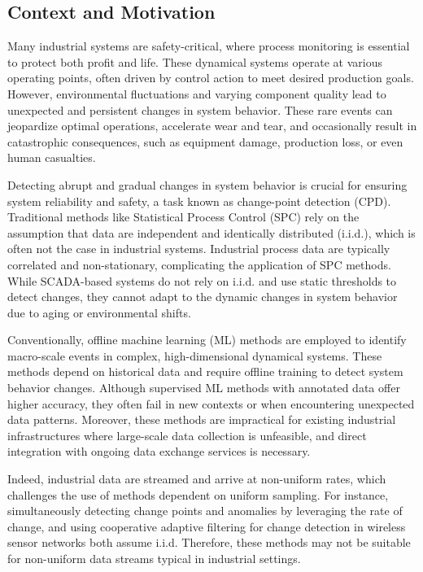 \subsection{Context and Motivation}
Many industrial systems are safety-critical, where process monitoring is essential to protect both profit and life. These dynamical systems operate at various operating points, often driven by control action to meet desired production goals. However, environmental fluctuations and varying component quality lead to unexpected and persistent changes in system behavior. These rare events can jeopardize optimal operations, accelerate wear and tear, and occasionally result in catastrophic consequences, such as equipment damage, production loss, or even human casualties.

Detecting abrupt and gradual changes in system behavior is crucial for ensuring system reliability and safety, a task known as change-point detection (CPD). Traditional methods like Statistical Process Control (SPC) rely on the assumption that data are independent and identically distributed (i.i.d.), which is often not the case in industrial systems. Industrial process data are typically correlated and non-stationary, complicating the application of SPC methods. While SCADA-based systems do not rely on i.i.d. and use static thresholds to detect changes, they cannot adapt to the dynamic changes in system behavior due to aging or environmental shifts.

Conventionally, offline machine learning (ML) methods are employed to identify macro-scale events in complex, high-dimensional dynamical systems. These methods depend on historical data and require offline training to detect system behavior changes. Although supervised ML methods with annotated data offer higher accuracy, they often fail in new contexts or when encountering unexpected data patterns. Moreover, these methods are impractical for existing industrial infrastructures where large-scale data collection is unfeasible, and direct integration with ongoing data exchange services is necessary.

Indeed, industrial data are streamed and arrive at non-uniform rates, which challenges the use of methods dependent on uniform sampling. For instance, \citet{Liu2023} simultaneously detecting change points and anomalies by leveraging the rate of change, and \citet{Fathy2019} using cooperative adaptive filtering for change detection in wireless sensor networks both assume i.i.d. Therefore, these methods may not be suitable for non-uniform data streams typical in industrial settings.

